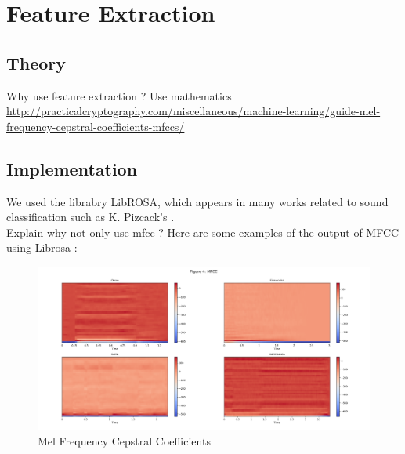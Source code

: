 \documentclass{article} %
\begin{document}
\section{Feature Extraction}

	\subsection{Theory}
		Why use feature extraction ? Use mathematics \url{http://practicalcryptography.com/miscellaneous/machine-learning/guide-mel-frequency-cepstral-coefficients-mfccs/}

	\subsection{Implementation}
		We used the librabry LibROSA, which appears in many works related to sound classification such as K. Pizcack's \cite{cite2}.\\

		Explain why not only use mfcc ?
		\newline
		Here are some examples of the output of MFCC using Librosa :
		\begin{figure}
		  \includegraphics[width=\linewidth]{mfcc.png}
		  \caption{Mel Frequency Cepstral Coefficients}
		\end{figure}
	
\end{document}
